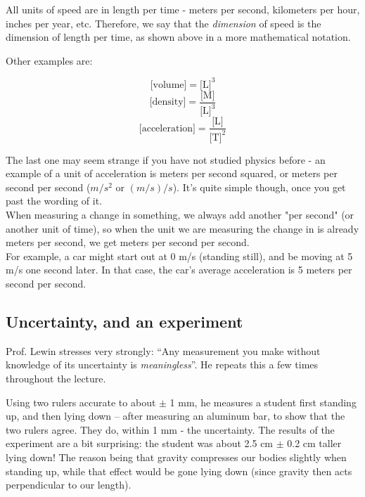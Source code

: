 \documentclass[8.01x]{subfiles}
\begin{document}
All units of speed are in length per time - meters per second, kilometers per hour, inches per year, etc. Therefore, we say that the \emph{dimension} of speed is the dimension of length per time, as shown above in a more mathematical notation.

Other examples are:

\begin{equation}
 \text{[volume]} =\text{[L]}^3
\end{equation}
\begin{equation}
 \text{[density]} = \frac{\text{[M]}}{\text{[L]}^3}
\end{equation}
\begin{equation}
 \text{[acceleration]} = \frac{\text{[L]}}{\text{[T]}^2}
\end{equation}

The last one may seem strange if you have not studied physics before - an example of a unit of acceleration is meters per second squared, or meters per second per second ($m/s^2$ or $(m/s)/s$). It's quite simple though, once you get past the wording of it.\\
When measuring a change in something, we always add another "per second" (or another unit of time), so when the unit we are measuring the change in is already meters per second, we get meters per second per second.\\
For example, a car might start out at 0 m/s (standing still), and be moving at 5 m/s one second later. In that case, the car's average acceleration is 5 meters per second per second.

\subsection{Uncertainty, and an experiment}
Prof. Lewin stresses very strongly: ``Any measurement you make without knowledge of its uncertainty is \emph{meaningless}''. He repeats this a few times throughout the lecture.

Using two rulers accurate to about $\pm$ 1 mm, he measures a student first standing up, and then lying down -- after measuring an aluminum bar, to show that the two rulers agree. They do, within 1 mm - the uncertainty.
The results of the experiment are a bit surprising: the student was about 2.5 cm $\pm$ 0.2 cm taller lying down! The reason being that gravity compresses our bodies slightly when standing up, while that effect would be gone lying down (since gravity then acts perpendicular to our length).
\end{document}
